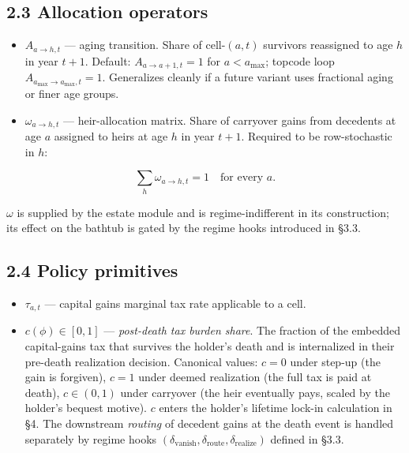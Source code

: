 \documentclass[11pt]{article}
\begin{document}
\subsection*{2.3 Allocation operators}

\begin{itemize}
  \item $A_{a \to h, t}$ — aging transition. Share of cell-$(a, t)$ survivors
    reassigned to age $h$ in year $t+1$. Default: $A_{a \to a+1, t} = 1$ for
    $a < a_{\max}$; topcode loop $A_{a_{\max} \to a_{\max}, t} = 1$. Generalizes
    cleanly if a future variant uses fractional aging or finer age groups.
\end{itemize}
\begin{itemize}
  \item $\omega_{a \to h, t}$ — heir-allocation matrix. Share of carryover gains
    from decedents at age $a$ assigned to heirs at age $h$ in year $t+1$.
    Required to be row-stochastic in $h$:
\end{itemize}

\[
  \sum_h \omega_{a \to h, t} = 1 \quad \text{for every } a.
  \]

$\omega$ is supplied by the estate module and is regime-indifferent in its construction; its effect on the bathtub is gated by the regime hooks introduced in §3.3.

\subsection*{2.4 Policy primitives}

\begin{itemize}
  \item $\tau_{a,t}$ — capital gains marginal tax rate applicable to a cell.
\end{itemize}
\begin{itemize}
  \item $c(\phi) \in [0, 1]$ — \emph{post-death tax burden share}. The fraction of the
    embedded capital-gains tax that survives the holder's death and is
    internalized in their pre-death realization decision. Canonical values:
    $c = 0$ under step-up (the gain is forgiven), $c = 1$ under deemed
    realization (the full tax is paid at death), $c \in (0, 1)$ under
    carryover (the heir eventually pays, scaled by the holder's bequest
    motive). $c$ enters the holder's lifetime lock-in calculation in §4. The
    downstream \emph{routing} of decedent gains at the death event is handled
    separately by regime hooks $(\delta_{\text{vanish}},
  \delta_{\text{route}}, \delta_{\text{realize}})$ defined in §3.3.
\end{itemize}
\end{document}
